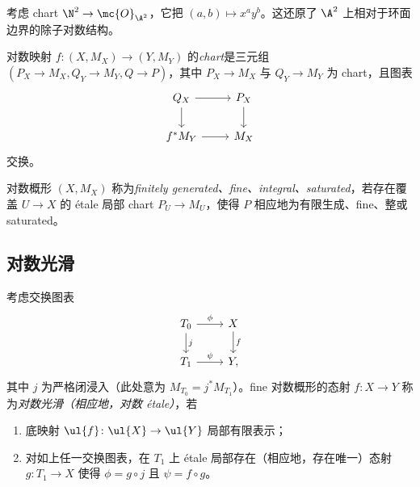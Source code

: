 \begin{exm}
    考虑 chart \(\N^2 \to \mc{O}_{\A^2}\)，它把 \((a,b) \mapsto x^a y^b\)。这还原了 \(\A^2\) 上相对于环面边界的除子对数结构。
\end{exm}

\begin{defn}
    对数映射 \(f \colon (X, M_X) \to (Y, M_Y)\) 的\textit{chart}是三元组 \((P_X\to M_X, Q_Y \to M_Y, Q \to P)\)，其中 \(P_X \to M_X\) 与 \(Q_Y \to M_Y\) 为 chart，且图表
    \begin{equation*}
    \begin{tikzcd}
        Q_X \ar{r} \ar{d} & P_X \ar{d} \\
        f^* M_Y \ar{r} & M_X
    \end{tikzcd}
    \end{equation*}
    交换。
\end{defn}

\begin{defn}
    对数概形 \((X, M_X)\) 称为\textit{finitely generated、fine、integral、saturated}，若存在覆盖 \(U \to X\) 的 \'etale 局部 chart \(P_U \to M_U\)，使得 \(P\) 相应地为有限生成、fine、整或 saturated。
\end{defn}

\subsection{对数光滑}%
\label{sub:Log smoothness}

\begin{defn}
    考虑交换图表
    \begin{equation*}
    \begin{tikzcd}
        T_0 \ar{r}{\phi} \ar{d}{j} & X \ar{d}{f} \\
        T_1 \ar{r}{\psi} & Y,
    \end{tikzcd}
    \end{equation*}
    其中 \(j\) 为严格闭浸入（此处意为 \(M_{T_0} = j^* M_{T_1}\)）。fine 对数概形的态射 \(f \colon X \to Y\) 称为\textit{对数光滑（相应地，对数 \'etale）}，若
    \begin{enumerate}
        \item 底映射 \(\ul{f} \colon \ul{X} \to \ul{Y}\) 局部有限表示；
        \item 对如上任一交换图表，在 \(T_1\) 上 \'etale 局部存在（相应地，存在唯一）态射 \(g \colon T_1 \to X\) 使得 \(\phi = g \circ j\) 且 \(\psi = f \circ g\)。
    \end{enumerate}
\end{defn}

